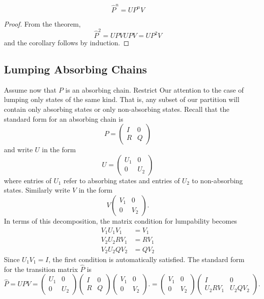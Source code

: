 \documentclass[12pt]{article}
\begin{document}
\begin{corollary}
  \[
    \hat{P}^n = U P^n V
  \]
\end{corollary}

\begin{proof}
  From the theorem,
  \[
    \hat{P}^2 = U P V U P V = U P^2 V
  \]
  and the corollary follows by induction.
\end{proof}


\subsection*{Lumping Absorbing Chains}

Assume  now  that  $P$  is  an  absorbing  chain.   Restrict  Our 
attention  to  the  case  of  lumping  only  states  of the  same  kind. 
That is,  any subset of our partition will  contain only absorbing states 
or  only  non-absorbing  states.     Recall  that the  standard form  for 
an absorbing chain is
\[
  P =
  \begin{pmatrix}
    I & 0 \\
    R & Q
  \end{pmatrix}
\]
and write $U$ in the form
\[
  U =
  \begin{pmatrix}
    U_1 & 0 \\
    0  & U_{2}
  \end{pmatrix}
\]
where entries of $U_1$ refer to absorbing states and entries of $U_2$
to non-absorbing states.  Similarly write $V$ in the form
\[
  V 
  \begin{pmatrix}
    V_1 & 0 \\
    0  & V_{2}
  \end{pmatrix}.
\]
In terms of this decomposition, the matrix condition for lumpability
becomes
\begin{align*}
  V_1 U_1 V_1 &= V_1 \\
  V_2 U_2 R V_1 &= R V_1 \\
  V_2 U_2 Q V_2 &= Q V_2
\end{align*}
Since $U_1 V_1 = I$, the first condition is automatically satisfied.
The standard form for the transition matrix $\hat{P}$ is
\[
  \hat{P} = UPV =   \begin{pmatrix}
    U_1 & 0 \\
    0  & U_{2}
  \end{pmatrix}
  \begin{pmatrix}
    I & 0 \\
    R & Q
  \end{pmatrix}
  \begin{pmatrix}
    V_1 & 0 \\
    0  & V_{2}
  \end{pmatrix}.
=   \begin{pmatrix}
    V_1 & 0 \\
    0  & V_{2}
  \end{pmatrix}
  \begin{pmatrix}
    I & 0 \\
    U_2 R V_1 & U_2 Q V_2
  \end{pmatrix}.
\]
\end{document}

